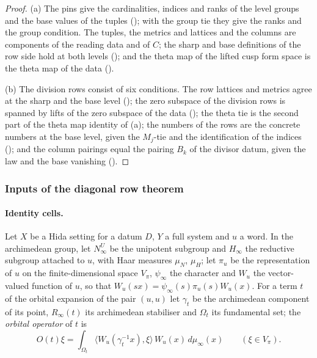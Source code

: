 \begin{proof}
(a) The pins give the cardinalities, indices and ranks of the level groups and the base values of the tuples
(); with the group tie they give the ranks and the group condition. The tuples, the
metrics and lattices and the columns are components of the reading data and of $C$; the sharp and base definitions of the row side hold
at both levels (); and the theta map of the lifted cusp form space is the theta map
of the data ().

(b) The division rows consist of six conditions. The row lattices and metrics agree at the sharp and the base level
(); the zero subspace of the division rows is spanned by lifts of
the zero subspace of the data (); the theta tie is the second part
of the theta map identity of (a); the numbers of the rows are the concrete numbers at the base level, given the $M_j$-tie and the
identification of the indices (); and the column pairings equal the
pairing $B_k$ of the divisor datum, given the law and the base vanishing ().
\end{proof}

\subsubsection{Inputs of the diagonal row theorem}\label{sec:pf:open0:diaginputs}

\paragraph{Identity cells.}
Let $X$ be a Hida setting for a datum $D$, $Y$ a full system and $u$ a word. In the archimedean group, let $N^U_\infty$ be the
unipotent subgroup and $H_\infty$ the reductive subgroup attached to $u$, with Haar measures $\mu_N$, $\mu_H$; let $\pi_u$ be the
representation of $u$ on the finite-dimensional space $V_\pi$, $\psi_\infty$ the character and $W_u$ the vector-valued function of
$u$, so that $W_u(sx)=\psi_\infty(s)\pi_u(s)W_u(x)$. For a term $t$ of the orbital expansion of the pair $(u,u)$ let $\gamma_t$ be the
archimedean component of its point, $R_\infty(t)$ its archimedean stabiliser and $\Omega_t$ its fundamental set; the \emph{orbital
operator} of $t$ is
\[
O(t)\xi=\int_{\Omega_t}\bigl\langle W_u(\gamma_t^{-1}x),\xi\bigr\rangle\,W_u(x)\,d\mu_\infty(x)\qquad(\xi\in V_\pi).
\]

